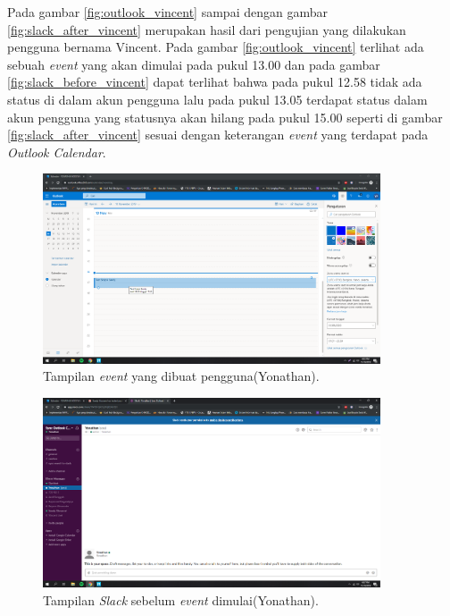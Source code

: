 Pada gambar \ref{fig:outlook_vincent} sampai dengan gambar \ref{fig:slack_after_vincent} merupakan hasil dari pengujian yang dilakukan pengguna bernama Vincent. Pada gambar \ref{fig:outlook_vincent} terlihat ada sebuah \textit{event} yang akan dimulai pada pukul 13.00 dan pada gambar \ref{fig:slack_before_vincent} dapat terlihat bahwa pada pukul 12.58 tidak ada status di dalam akun pengguna lalu pada pukul 13.05 terdapat status dalam akun pengguna yang statusnya akan hilang pada pukul 15.00 seperti di gambar \ref{fig:slack_after_vincent} sesuai dengan keterangan \textit{event} yang terdapat pada \textit{Outlook Calendar}. 
\clearpage

\begin{figure}[h]
  \includegraphics[width=10cm]{./Gambar/PengujianYonathan/Outlook.png}
  \centering
  \caption{Tampilan \textit{event} yang dibuat pengguna(Yonathan).}
  \label{fig:outlook_yonathan}
\end{figure}

\begin{figure}[h]
  \includegraphics[width=10cm]{./Gambar/PengujianYonathan/Slack_Before.png}
  \centering
  \caption{Tampilan \textit{Slack} sebelum \textit{event} dimulai(Yonathan).}
  \label{fig:slack_before_yonathan}
\end{figure}

